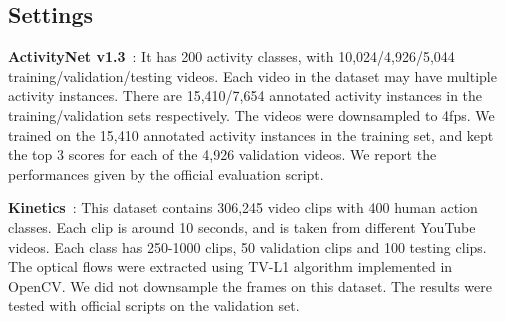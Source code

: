 \documentclass[runningheads]{llncs}
\begin{document}
\begin{table}[htbp]
\centering
  \caption{Ablation analysis of loss functions on ActivityNet v1.3 validation set.  stands for the mAP of ensemble score,  stands for the mAP of concatenation score.}
\label{tab:untrimmed_loss}
\end{table}

\subsection{Settings}
\textbf{ActivityNet v1.3}~\cite{caba2015activitynet}: It has 200 activity classes, with 10,024/4,926/5,044 training/validation/testing videos. Each video in the dataset may have multiple activity instances. There are 15,410/7,654 annotated activity instances in the training/validation sets respectively. The videos were downsampled to 4fps. We trained on the 15,410 annotated activity instances in the training set, and kept the top 3 scores for each of the 4,926 validation videos. We report the performances given by the official evaluation script.

\textbf{Kinetics}~\cite{kay2017kinetics}: This dataset contains 306,245 video clips with 400 human action classes. Each clip is around 10 seconds, and is taken from different YouTube videos. Each class has 250-1000 clips, 50 validation clips and 100 testing clips. The optical flows were extracted using TV-L1 algorithm implemented in OpenCV. We did not downsample the frames on this dataset. The results were tested with official scripts on the validation set.
\end{document}
